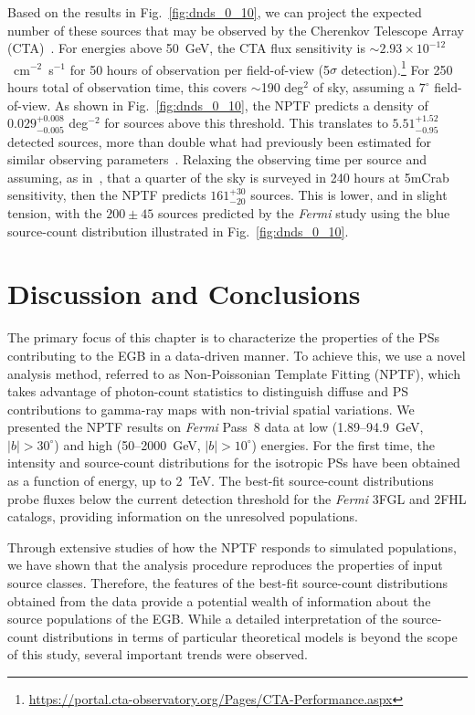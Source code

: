 Based on the results in Fig.~\ref{fig:dnds_0_10}, we can project the expected number of these sources that may be observed by the Cherenkov Telescope Array (CTA)~\cite{2011arXiv1111.2183C,Dubus:2012hm}.  For energies above 50~GeV, the CTA flux sensitivity is $\sim2.93\times10^{-12}$~cm$^{-2}$~s$^{-1}$ for 50 hours of observation per field-of-view (5$\sigma$ detection).\footnote{\url{https://portal.cta-observatory.org/Pages/CTA-Performance.aspx}}  For 250 hours total of observation time, this covers $\sim$190 deg$^2$ of sky, assuming a $7^\circ$ field-of-view.  As shown in Fig.~\ref{fig:dnds_0_10}, the NPTF predicts a density of $0.029^{+0.008}_{-0.005}$ deg$^{-2}$ for sources above this threshold.  This translates to $5.51_{-0.95}^{+1.52}$ detected sources, more than double what had previously been estimated for similar observing parameters~\cite{Dubus:2012hm}.  Relaxing the observing time per source and assuming, as in~\cite{TheFermi-LAT:2015ykq}, that a quarter of the sky is surveyed in 240 hours at 5mCrab sensitivity, then the NPTF predicts $161^{+30}_{-20}$ sources.  This is lower, and in slight tension, with the $200\pm45$ sources predicted by the \emph{Fermi} study using the blue source-count distribution illustrated in Fig.~\ref{fig:dnds_0_10}.




\section{Discussion and Conclusions}
\label{sec:conclusions_igrb}

The primary focus of this chapter is to characterize the properties of the PSs contributing to the EGB in a data-driven manner.  To achieve this, we use a novel analysis method, referred to as Non-Poissonian Template Fitting (NPTF), which takes advantage of photon-count statistics to distinguish diffuse and PS contributions to gamma-ray maps with non-trivial spatial variations.  We presented the NPTF results on \emph{Fermi} Pass~8 data at low (1.89--94.9~GeV, $|b| > 30^\circ$) and high (50--2000~GeV, $|b| > 10^\circ$) energies.  For the first time, the intensity and source-count distributions for the isotropic PSs have been  obtained as a function of energy, up to 2~TeV.  The best-fit source-count distributions probe fluxes below the current detection threshold for the \emph{Fermi} 3FGL and 2FHL catalogs, providing information on the unresolved populations. 

Through extensive studies of how the NPTF responds to simulated populations, we have shown that the analysis procedure reproduces the properties of input source classes.  Therefore, the features of the best-fit source-count distributions obtained from the data provide a potential wealth of information about the source populations of the EGB.  While a detailed interpretation of the source-count distributions in terms of particular theoretical models is beyond the scope of this study, several important trends were observed.  

